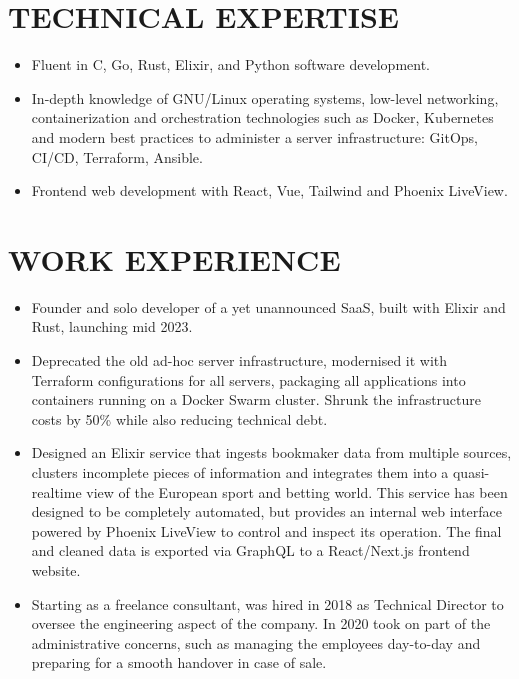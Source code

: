 \documentclass{resume}
\begin{document}

\section{TECHNICAL EXPERTISE}

\begin{itemize}
\item Fluent in C, Go, Rust, Elixir, and Python software development.
\item In-depth knowledge of GNU/Linux operating systems, low-level networking, containerization and orchestration technologies such as Docker, Kubernetes and modern best practices to administer a server infrastructure: GitOps, CI/CD, Terraform, Ansible.
\item Frontend web development with React, Vue, Tailwind and Phoenix LiveView.
\end{itemize}

\section{WORK EXPERIENCE}


\begin{itemize}
\item Founder and solo developer of a yet unannounced SaaS, built with Elixir and Rust, launching mid 2023.
\end{itemize}



\begin{itemize}
\item Deprecated the old ad-hoc server infrastructure, modernised it with Terraform configurations for all servers, packaging all applications into containers running on a Docker Swarm cluster. Shrunk the infrastructure costs by 50\% while also reducing technical debt.
\item Designed an Elixir service that ingests bookmaker data from multiple sources, clusters incomplete pieces of information and integrates them into a quasi-realtime view of the European sport and betting world. This service has been designed to be completely automated, but provides an internal web interface powered by Phoenix LiveView to control and inspect its operation. The final and cleaned data is exported via GraphQL to a React/Next.js frontend website.
\item Starting as a freelance consultant, was hired in 2018 as Technical Director to oversee the engineering aspect of the company. In 2020 took on part of the administrative concerns, such as managing the employees day-to-day and preparing for a smooth handover in case of sale.
\end{itemize}
\end{document}
